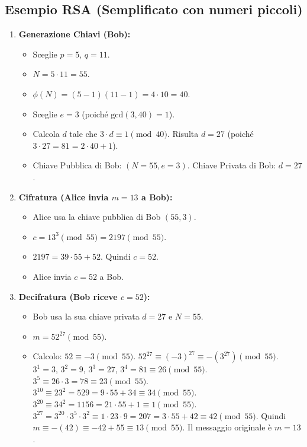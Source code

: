 \documentclass{article}
\begin{document}
\subsection{Esempio RSA (Semplificato con numeri piccoli)}
\begin{enumerate}[label=\alph*)]
    \item \textbf{Generazione Chiavi (Bob):}
    \begin{itemize}
        \item Sceglie $p = 5$, $q = 11$.
        \item $N = 5 \cdot 11 = 55$.
        \item $\phi(N) = (5-1)(11-1) = 4 \cdot 10 = 40$.
        \item Sceglie $e = 3$ (poiché $\text{gcd}(3, 40) = 1$).
        \item Calcola $d$ tale che $3 \cdot d \equiv 1 \pmod{40}$. Risulta $d = 27$ (poiché $3 \cdot 27 = 81 = 2 \cdot 40 + 1$).
        \item Chiave Pubblica di Bob: $(N=55, e=3)$. Chiave Privata di Bob: $d=27$.
    \end{itemize}
    \item \textbf{Cifratura (Alice invia $m=13$ a Bob):}
    \begin{itemize}
        \item Alice usa la chiave pubblica di Bob $(55, 3)$.
        \item $c = 13^3 \pmod{55} = 2197 \pmod{55}$.
        \item $2197 = 39 \cdot 55 + 52$. Quindi $c = 52$.
        \item Alice invia $c=52$ a Bob.
    \end{itemize}
    \item \textbf{Decifratura (Bob riceve $c=52$):}
    \begin{itemize}
        \item Bob usa la sua chiave privata $d=27$ e $N=55$.
        \item $m = 52^{27} \pmod{55}$.
        \item Calcolo: $52 \equiv -3 \pmod{55}$.
        $52^{27} \equiv (-3)^{27} \equiv -(3^{27}) \pmod{55}$.
        $3^1=3$, $3^2=9$, $3^3=27$, $3^4=81 \equiv 26 \pmod{55}$.
        $3^5 \equiv 26 \cdot 3 = 78 \equiv 23 \pmod{55}$.
        $3^{10} \equiv 23^2 = 529 = 9 \cdot 55 + 34 \equiv 34 \pmod{55}$.
        $3^{20} \equiv 34^2 = 1156 = 21 \cdot 55 + 1 \equiv 1 \pmod{55}$.
        $3^{27} = 3^{20} \cdot 3^5 \cdot 3^2 \equiv 1 \cdot 23 \cdot 9 = 207 = 3 \cdot 55 + 42 \equiv 42 \pmod{55}$.
        Quindi $m \equiv -(42) \equiv -42 + 55 \equiv 13 \pmod{55}$.
        Il messaggio originale è $m=13$.
    \end{itemize}
\end{enumerate}
\end{document}
